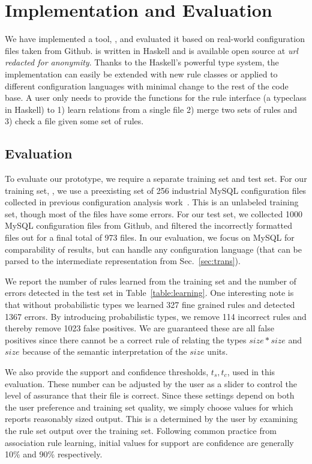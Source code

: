 
\section{Implementation and Evaluation}
\label{sec:eval}

We have implemented a tool, \app, and evaluated it based on real-world configuration files taken from Github.
\app is written in Haskell and is available open source at \textit{url redacted for anonymity}.
Thanks to the Haskell's powerful type system, the implementation can easily be extended with new rule classes or applied to different configuration languages with minimal change to the rest of the code base.
A user only needs to provide the functions for the rule interface (a typeclass in Haskell) to 1) learn relations from a single file 2) merge two sets of rules and 3) check a file given some set of rules.

\subsection{Evaluation}

To evaluate our \app prototype, we require a separate training set and test set. 
For our training set, \trainingSet, we use a preexisting set of 256 
industrial MySQL configuration files collected in previous configuration 
analysis work~\cite{configdataset}.
This is an unlabeled training set, though most of the files have some errors.
For our test set, we collected 1000 MySQL configuration files 
from Github, and filtered the incorrectly formatted files out for a final 
total of 973 files.
In our evaluation, we focus on MySQL for comparability of results, but \app can handle any configuration language (that can be parsed to the intermediate representation from Sec.~\ref{sec:trans}).

We report the number of rules learned from the training set and the number of errors detected in the test set in Table~\ref{table:learning}.
One interesting note is that without probabilistic types we learned 327 fine grained rules and detected 1367 errors.
By introducing probabilistic types, we remove 114 incorrect rules and thereby remove 1023 false positives.
We are guaranteed these are all false positives since there cannot be a correct rule of relating the types $size*size$ and $size$ because of the semantic interpretation of the $size$ units.

We also provide the support and confidence thresholds, $t_s, t_c$, used in this evaluation.
These number can be adjusted by the user as a slider to control the level of assurance that their file is correct.
Since these settings depend on both the user preference and training set quality, we simply choose values for which \app reports reasonably sized output.
This is a determined by the user by examining the rule set output over the training set.
Following common practice from association rule learning, initial values for support are confidence are generally 10\% and 90\% respectively.

